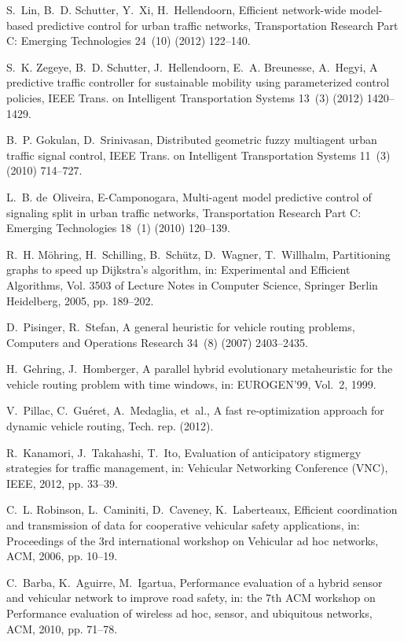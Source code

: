 \documentclass[10pt,onecolumn]{article}
\begin{document}
\begin{thebibliography}{00}
S.~Lin, B.~D. Schutter, Y.~Xi, H.~Hellendoorn, Efficient network-wide
  model-based predictive control for urban traffic networks, Transportation
  Research Part C: Emerging Technologies 24~(10) (2012) 122--140.

S.~K. Zegeye, B.~D. Schutter, J.~Hellendoorn, E.~A. Breunesse, A.~Hegyi, A
  predictive traffic controller for sustainable mobility using parameterized
  control policies, IEEE Trans. on Intelligent Transportation Systems 13~(3)
  (2012) 1420--1429.

B.~P. Gokulan, D.~Srinivasan, Distributed geometric fuzzy multiagent urban
  traffic signal control, IEEE Trans. on Intelligent Transportation Systems
  11~(3) (2010) 714--727.

L.~B. de~Oliveira, E-Camponogara, Multi-agent model predictive control of
  signaling split in urban traffic networks, Transportation Research Part C:
  Emerging Technologies 18~(1) (2010) 120--139.

R.~H. Möhring, H.~Schilling, B.~Schütz, D.~Wagner, T.~Willhalm, Partitioning
  graphs to speed up {D}ijkstra's algorithm, in: Experimental and Efficient
  Algorithms, Vol. 3503 of Lecture Notes in Computer Science, Springer Berlin
  Heidelberg, 2005, pp. 189--202.

D.~Pisinger, R.~Stefan, A general heuristic for vehicle routing problems,
  Computers and Operations Research 34~(8) (2007) 2403--2435.

H.~Gehring, J.~Homberger, A parallel hybrid evolutionary metaheuristic for the
  vehicle routing problem with time windows, in: EUROGEN'99, Vol.~2, 1999.

V.~Pillac, C.~Gu{\'e}ret, A.~Medaglia, et~al., A fast re-optimization approach
  for dynamic vehicle routing, Tech. rep. (2012).

R.~Kanamori, J.~Takahashi, T.~Ito, Evaluation of anticipatory stigmergy
  strategies for traffic management, in: Vehicular Networking Conference (VNC),
  IEEE, 2012, pp. 33--39.

C.~L. Robinson, L.~Caminiti, D.~Caveney, K.~Laberteaux, Efficient coordination
  and transmission of data for cooperative vehicular safety applications, in:
  Proceedings of the 3rd international workshop on Vehicular ad hoc networks,
  ACM, 2006, pp. 10--19.

C.~Barba, K.~Aguirre, M.~Igartua, Performance evaluation of a hybrid sensor and
  vehicular network to improve road safety, in: the 7th ACM workshop on
  Performance evaluation of wireless ad hoc, sensor, and ubiquitous networks,
  ACM, 2010, pp. 71--78.


\end{thebibliography}
\end{document}
